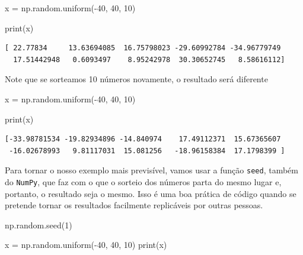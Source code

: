 \documentclass[
  brazilian,
  letterpaper,
  DIV=11,
  numbers=noendperiod]{scrreprt}
\newenvironment{Shaded}{\begin{snugshade}}{\end{snugshade}}
\newcommand{\BuiltInTok}[1]{\textcolor[rgb]{0.00,0.23,0.31}{#1}}
\newcommand{\DecValTok}[1]{\textcolor[rgb]{0.68,0.00,0.00}{#1}}
\newcommand{\NormalTok}[1]{\textcolor[rgb]{0.00,0.23,0.31}{#1}}
\newcommand{\OperatorTok}[1]{\textcolor[rgb]{0.37,0.37,0.37}{#1}}
\begin{document}
\begin{Shaded}
\begin{Highlighting}[]
\NormalTok{x }\OperatorTok{=}\NormalTok{ np.random.uniform(}\OperatorTok{{-}}\DecValTok{40}\NormalTok{, }\DecValTok{40}\NormalTok{, }\DecValTok{10}\NormalTok{)}

\BuiltInTok{print}\NormalTok{(x)}
\end{Highlighting}
\end{Shaded}

\begin{verbatim}
[ 22.77834     13.63694085  16.75798023 -29.60992784 -34.96779749
  17.51442948   0.6093497    8.95242978  30.30652745   8.58616112]
\end{verbatim}

Note que se sorteamos 10 números novamente, o resultado será diferente

\begin{Shaded}
\begin{Highlighting}[]
\NormalTok{x }\OperatorTok{=}\NormalTok{ np.random.uniform(}\OperatorTok{{-}}\DecValTok{40}\NormalTok{, }\DecValTok{40}\NormalTok{, }\DecValTok{10}\NormalTok{)}

\BuiltInTok{print}\NormalTok{(x)}
\end{Highlighting}
\end{Shaded}

\begin{verbatim}
[-33.98781534 -19.82934896 -14.840974    17.49112371  15.67365607
 -16.02678993   9.81117031  15.081256   -18.96158384  17.1798399 ]
\end{verbatim}

Para tornar o nosso exemplo mais previsível, vamos usar a função
\texttt{seed}, também do \texttt{NumPy}, que faz com o que o sorteio dos
números parta do mesmo lugar e, portanto, o resultado seja o mesmo. Isso
é uma boa prática de código quando se pretende tornar os resultados
facilmente replicáveis por outras pessoas.

\begin{Shaded}
\begin{Highlighting}[]
\NormalTok{np.random.seed(}\DecValTok{1}\NormalTok{)}

\NormalTok{x }\OperatorTok{=}\NormalTok{ np.random.uniform(}\OperatorTok{{-}}\DecValTok{40}\NormalTok{, }\DecValTok{40}\NormalTok{, }\DecValTok{10}\NormalTok{)}
\BuiltInTok{print}\NormalTok{(x)}
\end{Highlighting}
\end{Shaded}
\end{document}

